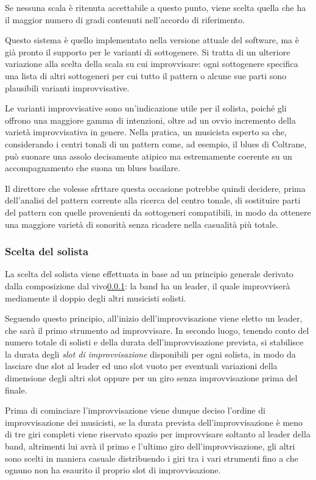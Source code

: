 Se nessuna scala è ritenuta accettabile a questo punto, viene scelta quella che ha il maggior numero di gradi contenuti nell'accordo di riferimento.

Questo sistema è quello implementato nella versione attuale del software, ma è già pronto il supporto per le varianti di sottogenere. Si tratta di un ulteriore variazione alla scelta della scala su cui improvvisare: ogni sottogenere specifica una lista di altri sottogeneri per cui tutto il pattern o alcune sue parti sono plausibili varianti improvvisative.

Le varianti improvvisative sono un'indicazione utile per il solista, poiché gli offrono una maggiore gamma di intenzioni, oltre ad un ovvio incremento della varietà improvvisativa in genere. Nella pratica, un musicista esperto sa che, considerando i centri tonali di un pattern come, ad esempio, il blues di Coltrane, può suonare una assolo decisamente atipico ma estremamente coerente su un accompagnamento che suona un blues basilare.

Il direttore che volesse sfrttare questa occasione potrebbe quindi decidere, prima dell'analisi del pattern corrente alla ricerca del centro tonale, di sostituire parti del pattern con quelle provenienti da sottogeneri compatibili, in modo da ottenere una maggiore varietà di sonorità senza ricadere nella casualità più totale.

\subsubsection{Scelta del solista}
La scelta del solista viene effettuata in base ad un principio generale derivato dalla composizione dal vivo\ref{}: la band ha un leader, il quale improvviserà mediamente il doppio degli altri musicisti solisti.

Seguendo questo principio, all'inizio dell'improvvisazione viene eletto un leader, che sarà il primo strumento ad improvvisare. In secondo luogo, tenendo conto del numero totale di solisti e della durata dell'improvvisazione prevista, si stabilisce la durata degli \emph{slot di improvvisazione} disponibili per ogni solista, in modo da lasciare due slot al leader ed uno slot vuoto per eventuali variazioni della dimensione degli altri slot oppure per un giro senza improvvisazione prima del finale.

Prima di cominciare l'improvvisazione viene dunque deciso l'ordine di improvvisazione dei musicisti, se la durata prevista dell'improvvisazione è meno di tre giri completi viene riservato spazio per improvvisare soltanto al leader della band, altrimenti lui avrà il primo e l'ultimo giro dell'improvvisazione, gli altri sono scelti in maniera casuale distribuendo i giri tra i vari strumenti fino a che ognuno non ha esaurito il proprio slot di improvvisazione.

